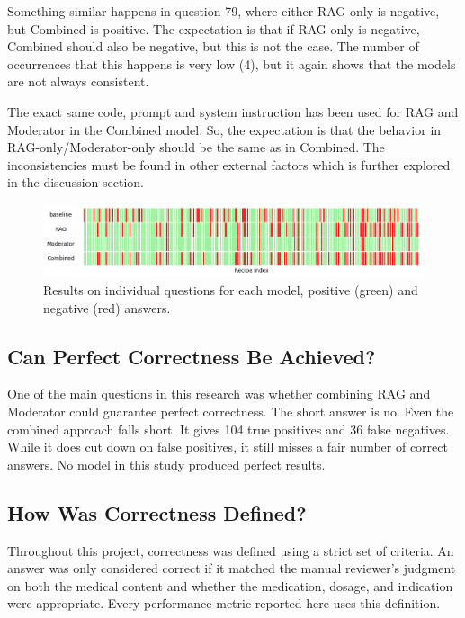 Something similar happens in question 79, where either RAG-only is negative, but Combined is positive.
The expectation is that if RAG-only is negative, Combined should also be negative, but this is not the case.
The number of occurrences that this happens is very low (4), but it again shows that the models are not always consistent.

The exact same code, prompt and system instruction has been used for RAG and Moderator in the Combined model.
So, the expectation is that the behavior in RAG-only/Moderator-only should be the same as in Combined.
The inconsistencies must be found in other external factors which is further explored in the discussion section.

\begin{figure}[H]
    \includegraphics[width=1\linewidth]{figures/dna-results.png}
    \caption{Results on individual questions for each model, positive (green) and negative (red) answers.}
    \label{fig:dna-results}
\end{figure}

\subsection{Can Perfect Correctness Be Achieved?}

One of the main questions in this research was whether combining RAG and Moderator could guarantee perfect correctness. The short answer is no. Even the combined approach falls short. It gives 104 true positives and 36 false negatives. While it does cut down on false positives, it still misses a fair number of correct answers. No model in this study produced perfect results.

\subsection{How Was Correctness Defined?}

Throughout this project, correctness was defined using a strict set of criteria. An answer was only considered correct if it matched the manual reviewer's judgment on both the medical content and whether the medication, dosage, and indication were appropriate. Every performance metric reported here uses this definition.

